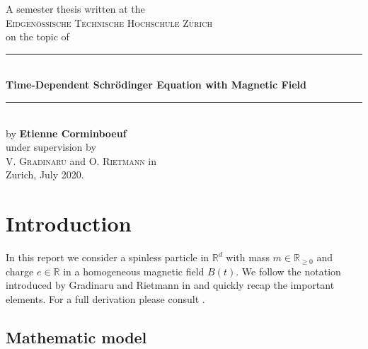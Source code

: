 \documentclass[11pt, a4paper, oneside]{article}
\begin{document}


\thispagestyle{empty}

\begin{center}
  A semester thesis written at the
  \\
  \textsc{Eidgen\"ossische Technische Hochschule Z\"urich}
  \\
  on the topic of
  \\[0.5cm]
  \rule{\linewidth}{0.5mm}
  \\[0.4cm]
  \Large
  \textbf{Time-Dependent Schr{\"o}dinger Equation with Magnetic Field}
  \normalsize
  \\[0.1cm]
  \rule{\linewidth}{0.5mm}
  \\[0.5cm]
  by \textbf{Etienne Corminboeuf}
  \\
  under supervision by
  \\
  \textsc{V. Gradinaru} and \textsc{O. Rietmann} in
  \\
  Zurich, July 2020.
  \\[1.0cm]
\end{center}

\tableofcontents

\section{Introduction} \label{sec:intro}
In this report we consider a spinless particle in $\mathbb{R}^d$ with mass $m \in \mathbb{R}_{\geq 0}$ and charge $e\in \mathbb{R}$ in a homogeneous magnetic field $B(t)$. We follow the notation introduced by Gradinaru and Rietmann in  and quickly recap the important elements. For a full derivation please consult .
\subsection{Mathematic model}
\end{document}
